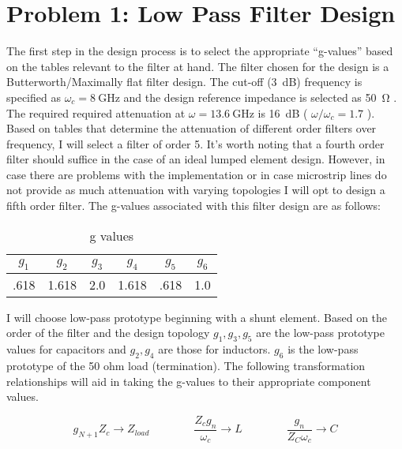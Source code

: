 \documentclass{article}
\begin{document}
    \section*{Problem 1: Low Pass Filter Design}

    The first step in the design process is to select the appropriate
    ``g-values'' based on the tables relevant to the filter at hand. The filter
    chosen for the design is a Butterworth/Maximally flat filter design. The
    cut-off (\SI{3}{\deci\bel}) frequency is specified as $ \omega_c =
    \SI{8}{\giga\hertz}$ and the design reference impedance is selected as
    \SI{50}{\ohm} . The required required attenuation at $ \omega =
    \SI{13.6}{\giga\hertz}$ is \SI{16}{\deci\bel} ( $ \omega/\omega_c = 1.7 $ ).
    Based on tables that determine the attenuation of different order filters
    over frequency, I will select a filter of order 5. It's worth noting that a
    fourth order filter should suffice in the case of an ideal lumped element
    design. However, in case there are problems with the implementation or in
    case microstrip lines do not provide as much attenuation with varying
    topologies I will opt to design a fifth order filter. The g-values
    associated with this filter design are as follows:

    \begin{table}[h]
        \centering
        \caption{g values}
        \label{tab:1a_g_value_table}
        \begin{tabular}{|c|c|c|c|c|c|}
            \hline $g_{1}$ & $g_{2}$  & $ g_{3} $ & $ g_{4} $ & $ g_{5} $ & $
            g_{6} $ \\ 
            \hline .618    & 1.618    & 2.0       &  1.618    & .618 & 1.0 \\
            \hline
        \end{tabular}
    \end{table}

    I will choose low-pass prototype beginning with a shunt element. Based on
    the order of the filter and the design topology $g_{1}, g_{3}, g_{5}$ are
    the low-pass prototype values for capacitors and $g_{2}, g_{4}$ are those
    for inductors. $g_{6}$ is the low-pass prototype of the 50 ohm load
    (termination). The following transformation relationships will aid in taking
    the g-values to their appropriate component values.

    \begin{equation}
    g_{N+1} Z_c \rightarrow Z_{load} \quad \quad \quad \quad
    \frac{Z_c g_n}{\omega_c} \rightarrow L \quad \quad \quad \quad
    \frac{g_n}{Z_C \omega_c } \rightarrow C
    \end{equation}
    
\end{document}
